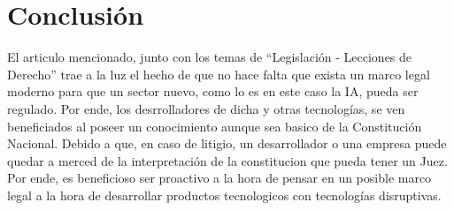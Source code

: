 \documentclass[10pt, a4paper]{article}
\begin{document}
\section{Conclusión}
\label{sec:conslusion}

El articulo mencionado, junto con los temas de \enquote{Legislación - Lecciones de Derecho} trae a la luz el hecho de que no hace falta que exista un marco legal moderno para que un sector nuevo, como lo es en este caso la IA, pueda ser regulado. Por ende, los desrrolladores de dicha y otras tecnologías, se ven beneficiados al poseer un conocimiento aunque sea basico de la Constitución Nacional. Debido a que, en caso de litigio, un desarrollador o una empresa puede quedar a merced de la interpretación de la constitucion que pueda tener un Juez. 
 Por ende, es beneficioso ser proactivo a la hora de pensar en un posible marco legal a la hora de desarrollar productos tecnologicos con tecnologías disruptivas.


\printbibliography

\end{document}
